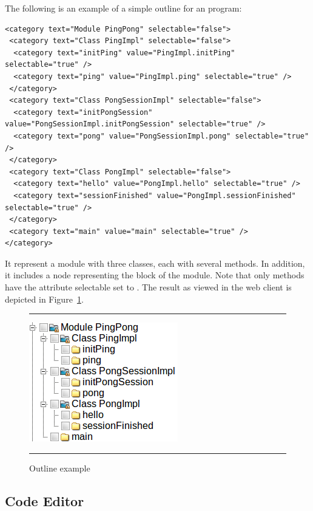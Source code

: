 \begin{example}
%
The following is an example of a simple outline for an \abs program:

\medskip
\begin{lstlisting}
<category text="Module PingPong" selectable="false">
 <category text="Class PingImpl" selectable="false">
  <category text="initPing" value="PingImpl.initPing" selectable="true" />
  <category text="ping" value="PingImpl.ping" selectable="true" />
 </category>
 <category text="Class PongSessionImpl" selectable="false">
  <category text="initPongSession" value="PongSessionImpl.initPongSession" selectable="true" />
  <category text="pong" value="PongSessionImpl.pong" selectable="true" />
 </category>
 <category text="Class PongImpl" selectable="false">
  <category text="hello" value="PongImpl.hello" selectable="true" />
  <category text="sessionFinished" value="PongImpl.sessionFinished" selectable="true" />
 </category>
 <category text="main" value="main" selectable="true" />
</category>
\end{lstlisting}

\medskip
\noindent
It represent a module with three classes, each with several
methods. In addition, it includes a node representing the 
block of the module. Note that only methods have the attribute
selectable set to . The result as viewed in the
web client is depicted in Figure~\ref{fig:clients:outline}.

\begin{figure}[t]
\hrule\smallskip
\begin{center}
\includegraphics[width=.3\textwidth]{fig/outline.png}
\end{center}
\caption{Outline example}
\label{fig:clients:outline}
\hrule
\end{figure}

\end{example}

\subsection{Code Editor}
\label{sec:clients:web:codearea}

